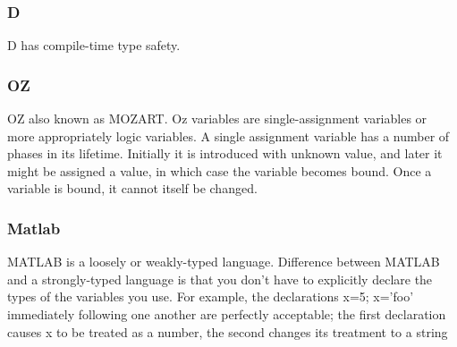 \documentclass{sig-alternate}
\begin{document}
	\subsubsection{D}
	D has compile-time type safety. 
	\subsubsection{OZ }
	OZ also known as MOZART. Oz variables are single-assignment variables or more appropriately logic variables. A single assignment variable has a number of phases in its lifetime. Initially it is introduced with unknown value, and later it might be assigned a value, in which case the variable becomes bound. Once a variable is bound, it cannot itself be changed.
	\subsubsection{Matlab}
	MATLAB is a loosely or weakly-typed language. Difference between MATLAB and a strongly-typed language is that you don't have to explicitly declare the types of the variables you use. For example, the declarations x=5; x='foo' immediately following one another are perfectly acceptable; the first declaration causes x to be treated as a number, the second changes its treatment to a string
\end{document}
